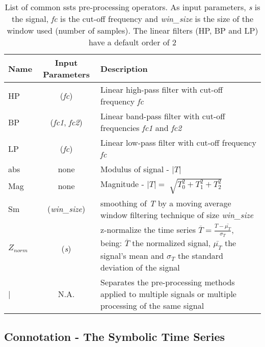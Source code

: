 \begin{center}
\begin{table}
	\centering
    \setlength{\tabcolsep}{3pt}
	\renewcommand{\arraystretch}{1.5}
	\caption{List of common \gls{ssts} pre-processing operators. As input parameters, \textit{s} is the signal, \textit{fc} is the cut-off frequency and \textit{win\_size} is the size of the window used (number of samples). The linear filters (HP, BP and LP) have a default order of 2}
	~\\~
	\label{tab:preprocess}
	\begin{tabular}{lcP}
        \toprule[0.5mm]
		Name & Input Parameters & Description\\
        \midrule[0.3mm]
		HP & (\textit{fc}) & Linear high-pass filter with cut-off frequency \textit{fc}\\
        \midrule
		BP & (\textit{fc1}, \textit{fc2}) & Linear band-pass filter with cut-off frequencies \textit{fc1} and \textit{fc2}\\ 
        \midrule
 		LP & (\textit{fc}) & Linear low-pass filter with cut-off frequency \textit{fc}\\
        \midrule
        abs & none & Modulus of signal - $|T|$\\
        \midrule
        Mag & none & Magnitude - $|T| = \sqrt[]{T_0^2 + T_1^2 + T_2^2}$\\
        \midrule
        Sm &  (\textit{win\_size}) & smoothing of \textit{T} by a moving average window filtering technique of size \textit{win\_size}\\
        \midrule
        $Z_{norm}$ & (\textit{s}) & z-normalize the time series $\overline{T} = \frac{T-\bar{\mu_T}}{\sigma_T}$, being: $\overline{T}$ the normalized signal, $\bar{\mu_T}$ the signal's mean and $\sigma_T$ the standard deviation of the signal\\
        \midrule
        | & N.A. & Separates the pre-processing methods applied to multiple signals or multiple processing of the same signal\\
        \bottomrule[0.5mm]
 	\hline
	\end{tabular}
\end{table}
\end{center}

\subsection{Connotation - The Symbolic Time Series}
\label{subsec:symbolic_connotation}


